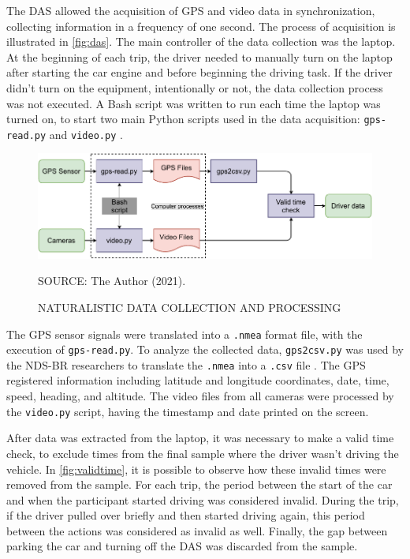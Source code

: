 
The DAS allowed the acquisition of GPS and video data in synchronization, collecting information in a frequency of one second. The process of acquisition is illustrated in \autoref{fig:das}. The main controller of the data collection was the laptop. At the beginning of each trip, the driver needed to manually turn on the laptop after starting the car engine and before beginning the driving task. If the driver didn't turn on the equipment, intentionally or not, the data collection process was not executed. A Bash script was written to run each time the laptop was turned on, to start two main Python scripts used in the data acquisition: \verb|gps-read.py| and \verb|video.py| \cite{Borguezani2020}.  

\begin{figure}[!htbp]
    \centering\footnotesize
    \captionsetup{font=footnotesize}
    \caption{NATURALISTIC DATA COLLECTION AND PROCESSING}
    \includegraphics{fig/DAS.pdf}
    \label{fig:das}
    \par SOURCE: The Author (2021).
\end{figure}

The GPS sensor signals were translated into a \verb|.nmea| format file, with the execution of \verb|gps-read.py|. To analyze the collected data, \verb|gps2csv.py| was used by the NDS-BR researchers to translate the \verb|.nmea| into a \verb|.csv| file \cite{Pereira2020}. The GPS registered information including latitude and longitude coordinates, date, time, speed, heading, and altitude. The video files from all cameras were processed by the \verb|video.py| script, having the timestamp and date printed on the screen.

After data was extracted from the laptop, it was necessary to make a valid time check, to exclude times from the final sample where the driver wasn't driving the vehicle. In \autoref{fig:validtime}, it is possible to observe how these invalid times were removed from the sample. For each trip, the period between the start of the car and when the participant started driving was considered invalid. During the trip, if the driver pulled over briefly and then started driving again, this period between the actions was considered as invalid as well. Finally, the gap between parking the car and turning off the DAS was discarded from the sample.  

